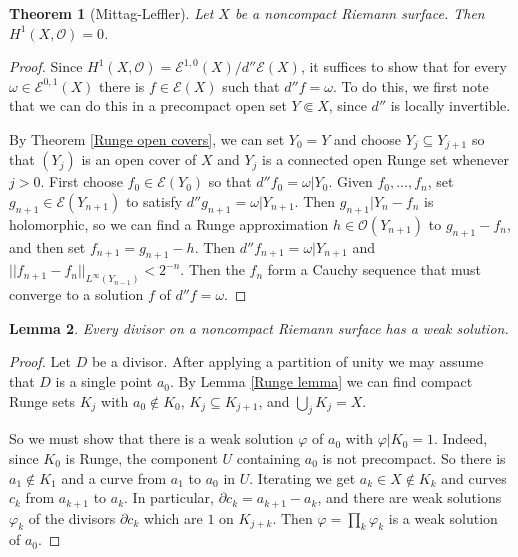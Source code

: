 \documentclass[reqno,12pt,letterpaper]{amsart}
\newcommand{\Olo}{\mathscr O}
\newcommand{\Smooth}{\mathscr E}
\newtheorem{theorem}{Theorem}[section]
\newtheorem{lemma}[theorem]{Lemma}
\theoremstyle{definition}
\begin{document}
\begin{theorem}[Mittag-Leffler]
\label{noncompact has no sheaf cohomology}
Let $X$ be a noncompact Riemann surface. Then $H^1(X, \Olo) = 0$.
\end{theorem}
\begin{proof}
Since $H^1(X, \Olo) = \Smooth^{1,0}(X)/d''\Smooth(X)$, it suffices to show that for every $\omega \in \Smooth^{0,1}(X)$ there is $f \in \Smooth(X)$ such that $d''f = \omega$.
To do this, we first note that we can do this in a precompact open set $Y \Subset X$, since $d''$ is locally invertible.

By Theorem \ref{Runge open covers}, we can set $Y_0 = Y$ and choose $Y_j \subseteq Y_{j+1}$ so that $(Y_j)$ is an open cover of $X$ and $Y_j$ is a connected open Runge set whenever $j > 0$.
First choose $f_0 \in \Smooth(Y_0)$ so that $d''f_0 = \omega|Y_0$.
Given $f_0, \dots, f_n$, set $g_{n+1} \in \Smooth(Y_{n+1})$ to satisfy $d''g_{n+1} = \omega|Y_{n+1}$.
Then $g_{n+1}|Y_n - f_n$ is holomorphic, so we can find a Runge approximation $h \in \Olo(Y_{n+1})$ to $g_{n+1} - f_n$, and then set $f_{n+1} = g_{n+1} - h$.
Then $d''f_{n+1} = \omega|Y_{n+1}$ and $||f_{n+1} - f_n||_{L^\infty(Y_{n-1})} < 2^{-n}$.
Then the $f_n$ form a Cauchy sequence that must converge to a solution $f$ of $d''f = \omega$.
\end{proof}

\begin{lemma}
\label{line bundles are topologically trivial}
Every divisor on a noncompact Riemann surface has a weak solution.
\end{lemma}
\begin{proof}
Let $D$ be a divisor.
After applying a partition of unity we may assume that $D$ is a single point $a_0$.
By Lemma \ref{Runge lemma} we can find compact Runge sets $K_j$ with $a_0 \notin K_0$, $K_j \subseteq K_{j+1}$, and $\bigcup_j K_j = X$.

So we must show that there is a weak solution $\varphi$ of $a_0$ with $\varphi|K_0 = 1$.
Indeed, since $K_0$ is Runge, the component $U$ containing $a_0$ is not precompact.
So there is $a_1 \notin K_1$ and a curve from $a_1$ to $a_0$ in $U$.
Iterating we get $a_k \in X \notin K_k$ and curves $c_k$ from $a_{k+1}$ to $a_k$.
In particular, $\partial c_k = a_{k+1} - a_k$, and there are weak solutions $\varphi_k$ of the divisors $\partial c_k$ which are $1$ on $K_{j+k}$.
Then $\varphi = \prod_k \varphi_k$ is a weak solution of $a_0$.
\end{proof}
\end{document}
